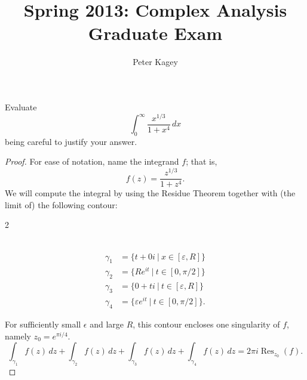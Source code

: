 \documentclass{article}
\newenvironment{problem}[2][Problem]{\begin{trivlist}
\item[\hskip \labelsep {\bfseries #1}\hskip \labelsep {\bfseries #2.}]}{\end{trivlist}}
\begin{document}
\title{Spring 2013: Complex Analysis Graduate Exam}
\author{Peter Kagey}

\maketitle

\begin{problem}{1}
  Evaluate \[
    \int_0^\infty \frac{x^{1/3}}{1 + x^4}\,dx
  \] being careful to justify your answer.
\end{problem}

\begin{proof}
  For ease of notation, name the integrand $f$; that is, \[
    f(z) = \frac{z^{1/3}}{1 + z^4}.
  \]
  We will compute the integral by using the Residue Theorem together with (the
  limit of) the following contour:
  \begin{multicols}{2}
  \\
  \begin{align}
    \gamma_{1} &= \{t + 0i\ |\ x \in [\varepsilon, R] \} \\
    \gamma_{2} &= \{R e^{it}\ |\ t \in [0,\pi/2] \} \\
    \gamma_{3} &= \{0 + ti\ |\ t \in [\varepsilon, R]\} \\
    \gamma_{4} &= \{\varepsilon e^{it}\ |\ t \in [0, \pi/2]\}.
  \end{align}
  \end{multicols}
  For sufficiently small $\epsilon$ and large $R$, this contour encloses one
  singularity of $f$, namely $z_0 = e^{\pi i/4}$.
  \[
    \int_{\gamma_1} f(z)\,dz +
    \int_{\gamma_2} f(z)\,dz +
    \int_{\gamma_3} f(z)\,dz +
    \int_{\gamma_4} f(z)\,dz =
    2\pi i \operatorname{Res}_{z_0}(f).
  \]
\end{proof}
\end{document}

